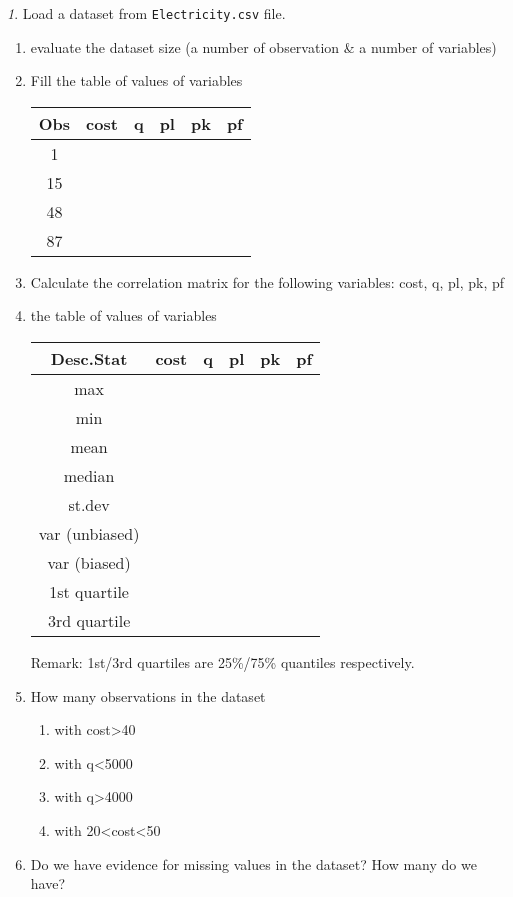 \documentclass[12pt]{article}
\theoremstyle{remark}
\newtheorem{problem}{}[section]
\begin{document}
\begin{problem}
Load a dataset from \texttt{Electricity.csv} file.
\begin{enumerate}
	\item evaluate the dataset size (a number of observation \& a number of variables)
	\item Fill the table of values of variables
	\begin{center}
		\begin{tabular}{|c|c|c|c|c|c|} \hline
			Obs & cost & q & pl & pk & pf \\ \hline\hline
			1 & & & & & \\ \hline
			15 & & & &  & \\ \hline
			48 & & & & & \\ \hline
			87 & & & & & \\ \hline
		\end{tabular}
	\end{center}
	\item Calculate the correlation matrix for the following
	variables: cost, q, pl, pk, pf 
	\item the table of values of variables
	\begin{center}
		\begin{tabular}{|c|c|c|c|c|c|} \hline
			Desc.Stat & cost & q & pl & pk & pf\\ \hline\hline
			max & & & & & \\ \hline
			min & & & & & \\ \hline
			mean & & & &  & \\ \hline
			median & & & & & \\ \hline
			st.dev & & & & & \\ \hline
			var (unbiased) & & & & & \\ \hline
			var (biased) & & & & & \\ \hline
			1st quartile & & & & & \\ \hline
			3rd quartile & & & & & \\ \hline
		\end{tabular}
	\end{center}
	Remark: 1st/3rd quartiles are 25\%/75\% quantiles respectively.
	\item How many observations in the dataset 
		\begin{enumerate}
			\item with cost>40
			\item with q<5000
			\item with q>4000
			\item with 20<cost<50
		\end{enumerate}
	\item Do we have evidence for missing values in the dataset?
	How many do we have?
\end{enumerate}
\end{problem}
\end{document}
